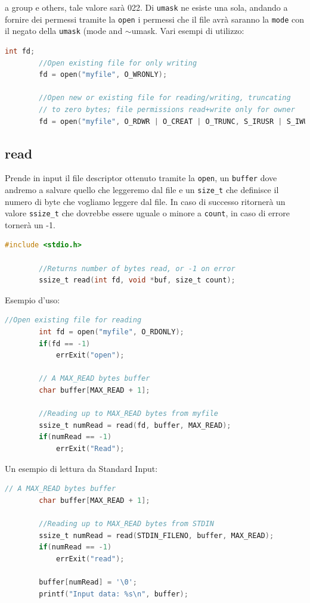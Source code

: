\documentclass[a4paper, 12pt]{book}
\begin{document}
    a group e others, tale valore sarà 022. Di \verb|umask|
    ne esiste una sola, andando a fornire dei permessi tramite 
    la \verb|open| i permessi che il file avrà saranno 
    la \verb|mode| con il negato della \verb|umask| (mode and
    $\sim$umask. 
    Vari esempi di utilizzo:
    \begin{lstlisting}[language=C]
        int fd;
        //Open existing file for only writing
        fd = open("myfile", O_WRONLY);

        //Open new or existing file for reading/writing, truncating 
        // to zero bytes; file permissions read+write only for owner
        fd = open("myfile", O_RDWR | O_CREAT | O_TRUNC, S_IRUSR | S_IWUSR);
    \end{lstlisting}
    
    \subsection{read}

    Prende in input il file descriptor ottenuto tramite la 
     \verb|open|, un \verb|buffer| dove andremo a salvare quello che 
    leggeremo dal file e un \verb|size_t| che definisce il numero di byte 
    che vogliamo leggere dal file. In caso di successo ritornerà 
    un valore \verb|ssize_t| che dovrebbe essere uguale o minore a \verb|count|, in caso di
    errore tornerà un -1.
    \begin{lstlisting}[language=C]
        #include <stdio.h> 

        //Returns number of bytes read, or -1 on error
        ssize_t read(int fd, void *buf, size_t count);
    \end{lstlisting}
    Esempio d'uso:
    \begin{lstlisting}[language=C]
        //Open existing file for reading
        int fd = open("myfile", O_RDONLY);
        if(fd == -1)
            errExit("open");
        
        // A MAX_READ bytes buffer
        char buffer[MAX_READ + 1];

        //Reading up to MAX_READ bytes from myfile
        ssize_t numRead = read(fd, buffer, MAX_READ);
        if(numRead == -1)
            errExit("Read");
    \end{lstlisting}
    Un esempio di lettura da Standard Input:
    \begin{lstlisting}[language=C]
        // A MAX_READ bytes buffer
        char buffer[MAX_READ + 1];

        //Reading up to MAX_READ bytes from STDIN
        ssize_t numRead = read(STDIN_FILENO, buffer, MAX_READ);
        if(numRead == -1)
            errExit("read");
        
        buffer[numRead] = '\0';
        printf("Input data: %s\n", buffer);
    \end{lstlisting}
\end{document}

